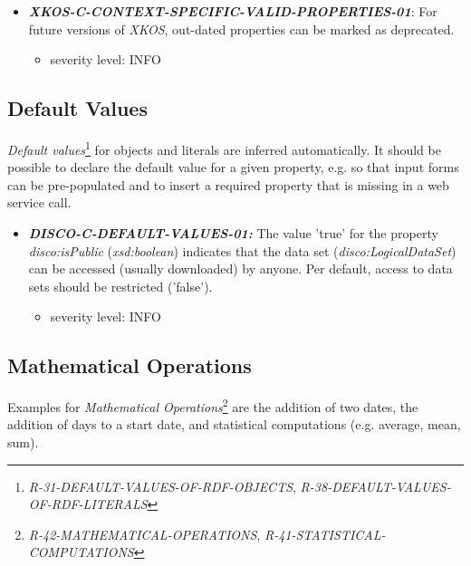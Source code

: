 \documentclass{llncs}
\begin{document}
\begin{itemize}
	\item \textbf{{\em XKOS-C-CONTEXT-SPECIFIC-VALID-PROPERTIES-01}}: For future versions of \emph{XKOS}, out-dated properties can be marked as deprecated.
	\begin{itemize}
		\item severity level: INFO
	\end{itemize}
\end{itemize}

\subsection{Default Values}

\emph{Default values}\footnote{{\em R-31-DEFAULT-VALUES-OF-RDF-OBJECTS}, {\em R-38-DEFAULT-VALUES-OF-RDF-LITERALS}} for objects and literals are inferred automatically.
It should be possible to declare the default value for a given property, e.g. so that input forms can be pre-populated and to insert a required property that is missing in a web service call.

\begin{itemize}
	\item \textbf{{\em DISCO-C-DEFAULT-VALUES-01:}}
The value 'true' for the property {\em disco:isPublic} ({\em xsd:boolean}) indicates that the data set ({\em disco:LogicalDataSet}) can be accessed (usually downloaded) by anyone.
Per default, access to data sets should be restricted ('false').
\begin{itemize}
		\item severity level: INFO
	\end{itemize}
\end{itemize}

\subsection{Mathematical Operations}

Examples for {\em Mathematical Operations}\footnote{{\em R-42-MATHEMATICAL-OPERATIONS}, {\em R-41-STATISTICAL-COMPUTATIONS}} are the addition of two dates, the addition of days to a start date, and statistical computations (e.g. average, mean, sum).
\end{document}
